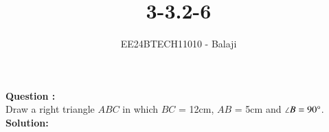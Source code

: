 \documentclass[journal]{IEEEtran}
\begin{document}

\vspace{3cm}

\title{3-3.2-6}
\author{EE24BTECH11010 - Balaji}
{\let\newpage\relax\maketitle}

\renewcommand{\thefigure}{\theenumi}
\renewcommand{\thetable}{\theenumi}
\setlength{\intextsep}{10pt} %

\renewcommand{\thetable}{\theenumi}

\textbf{Question :} \\
Draw a right triangle $ABC$ in which $BC$ = 12cm, $AB$ = 5cm and $\angle{B} = 90\degree$.\\
\textbf{Solution:}
\end{document}
